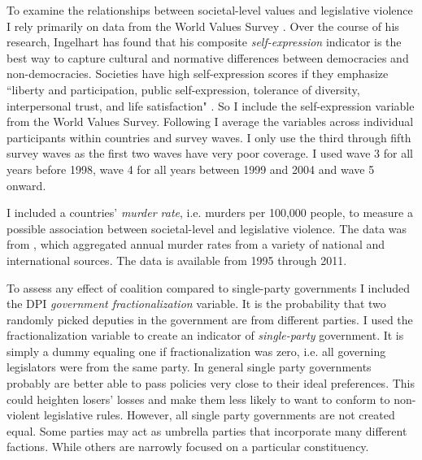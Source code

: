 \documentclass[a4paper]{article}\usepackage[]{graphicx}\usepackage[]{color}
\begin{document}
To examine the relationships between societal-level values and legislative violence I rely primarily on data from the World Values Survey \citeyearpar{WVS2009}. Over the course of his research, Ingelhart has found that his composite {\emph{self-expression}} indicator is the best way to capture cultural and normative differences between democracies and non-democracies. Societies have high self-expression scores if they emphasize ``liberty and participation, public self-expression, tolerance of diversity, interpersonal trust, and life satisfaction" \citep[64]{Inglehart2003}. So I include the self-expression variable from the World Values Survey. Following \cite{Inglehart2003} I average the variables across individual participants within countries and survey waves. I only use the third through fifth survey waves as the first two waves have very poor coverage. I used wave 3 for all years before 1998, wave 4 for all years between 1999 and 2004 and wave 5 onward. 

I included a countries' \emph{murder rate}, i.e. murders per 100,000 people, to measure a possible association between societal-level and legislative violence. The data was from \cite{UNMurder2013}, which aggregated annual murder rates from a variety of national and international sources. The data is available from 1995 through 2011.

To assess any effect of coalition compared to single-party governments I included the DPI {\emph{government fractionalization}} variable. It is the probability that two randomly picked deputies in the government are from different parties. I used the fractionalization variable to create an indicator of {\emph{single-party}} government. It is simply a dummy equaling one if fractionalization was zero, i.e. all governing legislators were from the same party. In general single party governments probably are better able to pass policies very close to their ideal preferences. This could heighten losers' losses and make them less likely to want to conform to non-violent legislative rules. However, all single party governments are not created equal. Some parties may act as umbrella parties that incorporate many different factions. While others are narrowly focused on a particular constituency. 
\end{document}
